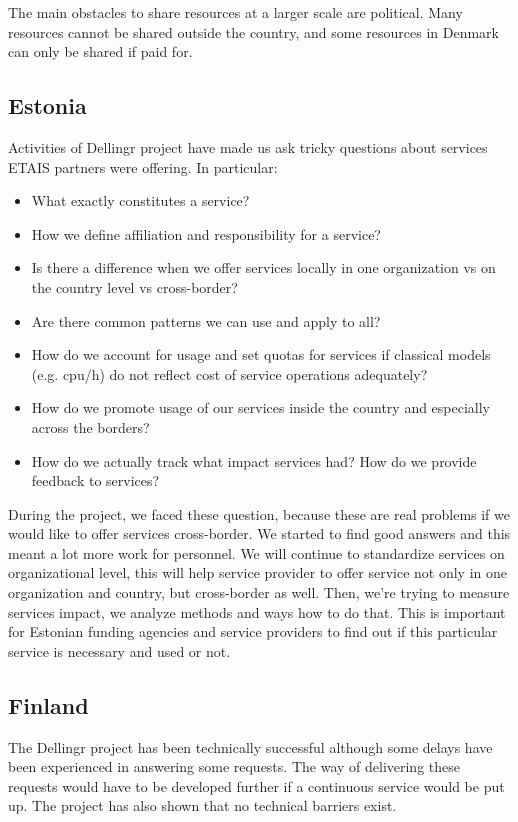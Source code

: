 \documentclass{article}
\newcommand{\dell}{Dellingr\xspace}
\begin{document}
The main obstacles to share resources at a larger scale are political. Many resources cannot be shared outside the country, and some resources in Denmark can only be shared if paid for. 

\subsection{Estonia}

Activities of \dell project have made us ask tricky questions about services ETAIS partners were offering. In particular:
\begin{itemize}
\item What exactly constitutes a service? 
\item How we define affiliation and responsibility for a service?
\item Is there a difference when we offer services locally in one organization vs on the country level vs cross-border?
\item Are there common patterns we can use and apply to all?
\item How do we account for usage and set quotas for services if classical models (e.g. cpu/h) do not reflect cost of service operations adequately?
\item How do we promote usage of our services inside the country and especially across the borders?
\item How do we actually track what impact services had? How do we provide feedback to services?
\end{itemize}

During the project, we faced these question, because these are real problems if we would like to offer services cross-border. 
We started to find good answers and this meant a lot more work for personnel. We will continue to standardize services on organizational level, this will help service provider to offer service not only in one organization and country, but cross-border as well. 
Then, we're trying to measure services impact, we analyze methods and ways how to do that. 
This is important for Estonian funding agencies and service providers to find out if this particular service is necessary and used or not. 

\subsection{Finland}

The \dell project has been technically successful although some delays have been experienced in answering some requests. 
The way of delivering these requests would have to be developed further if a continuous service would be put up. 
The project has also shown that no technical barriers exist.
\end{document}
